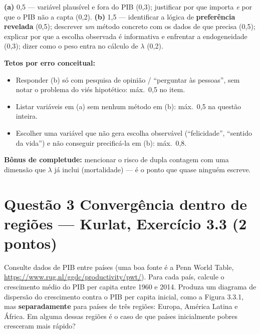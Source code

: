\documentclass[11pt, a4paper]{article}
\begin{document}
\begin{tcolorbox}[rubricbox]
\small
\textbf{(a)} 0,5 --- variável plausível e fora do PIB (0,3); justificar por que importa
\emph{e} por que o PIB não a capta (0,2).
\textbf{(b)} 1,5 --- identificar a lógica de \textbf{preferência revelada} (0,5);
descrever \emph{um} método concreto com os dados de que precisa (0,5); explicar por que a
escolha observada é informativa e enfrentar a endogeneidade (0,3); dizer como o peso entra
no cálculo de $\lambda$ (0,2).

\smallskip
\textbf{Tetos por erro conceitual:}
\begin{itemize}[topsep=2pt]
\item Responder (b) só com pesquisa de opinião / ``perguntar às pessoas'', sem notar o
      problema do viés hipotético: máx.\ 0,5 no item.
\item Listar variáveis em (a) sem nenhum método em (b): máx.\ 0,5 na questão inteira.
\item Escolher uma variável que não gera escolha observável (``felicidade'', ``sentido da
      vida'') e não conseguir precificá-la em (b): máx.\ 0,8.
\end{itemize}
\textbf{Bônus de completude:} mencionar o risco de dupla contagem com uma dimensão que
$\lambda$ já inclui (mortalidade) --- é o ponto que quase ninguém escreve.
\end{tcolorbox}

\section[Questão 3 --- Convergência dentro de regiões (Kurlat 3.3)]{Questão 3 \quad Convergência dentro de regiões --- Kurlat, Exercício 3.3 \hfill \normalsize (2 pontos)}

\begin{tcolorbox}[questionbox]
\small
Consulte dados de PIB entre países (uma boa fonte é a Penn World Table,
\url{https://www.rug.nl/ggdc/productivity/pwt/}). Para cada país, calcule o crescimento
médio do PIB per capita entre 1960 e 2014. Produza um diagrama de dispersão do crescimento
contra o PIB per capita inicial, como a Figura 3.3.1, mas \textbf{separadamente} para
países de três regiões: Europa, América Latina e África. Em alguma dessas regiões é o caso
de que países inicialmente pobres cresceram mais rápido?
\end{tcolorbox}
\end{document}
